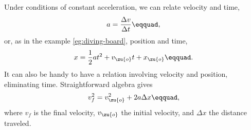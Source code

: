 Under conditions of constant acceleration,
we can relate velocity and time,
\begin{equation*}
  a = \frac{\Delta v}{\Delta t}\eqquad,
\end{equation*}
or, as in the example \ref{eg:diving-board}, position and time,
\begin{equation*}
  x =  \frac{1}{2}at^2 + v_\zu{o} t + x_\zu{o}\eqquad.
\end{equation*}
It can also be handy to have a relation involving velocity and position, eliminating time.
Straightforward algebra gives
\begin{equation*}
  v_f^2 = v_\zu{o}^2 + 2 a \Delta x\eqquad,
\end{equation*}
where $v_f$ is the final velocity, $v_\zu{o}$ the initial velocity, and $\Delta x$ the
distance traveled.

\vspace{0mm plus 5mm}


\vspace{0mm plus 5mm}


\vspace{0mm plus 5mm}

